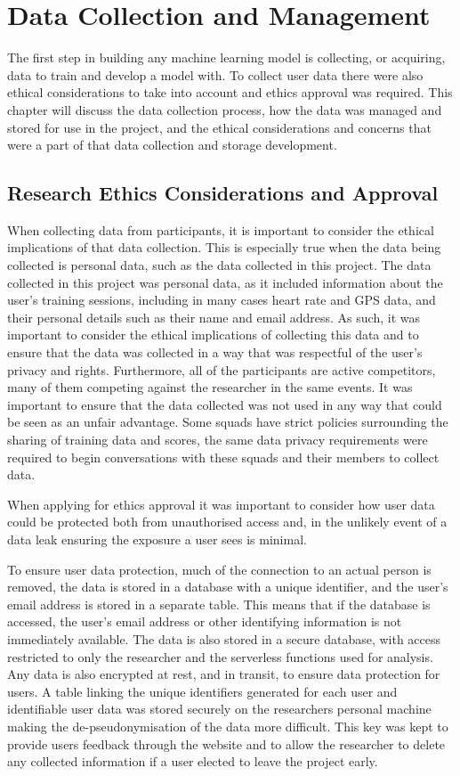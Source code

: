 \chapter{Data Collection and Management}
The first step in building any machine learning model is collecting, or acquiring, data to train and develop a model with. To collect user data there were also ethical considerations to take into account and ethics approval was required. This chapter will discuss the data collection process, how the data was managed and stored for use in the project, and the ethical considerations and concerns that were a part of that data collection and storage development.

\section{Research Ethics Considerations and Approval}
When collecting data from participants, it is important to consider the ethical implications of that data collection. This is especially true when the data being collected is personal data, such as the data collected in this project. The data collected in this project was personal data, as it included information about the user's training sessions, including in many cases heart rate and GPS data, and their personal details such as their name and email address. As such, it was important to consider the ethical implications of collecting this data and to ensure that the data was collected in a way that was respectful of the user's privacy and rights. Furthermore, all of the participants are active competitors, many of them competing against the researcher in the same events. It was important to ensure that the data collected was not used in any way that could be seen as an unfair advantage. Some squads have strict policies surrounding the sharing of training data and scores, the same data privacy requirements were required to begin conversations with these squads and their members to collect data. 

When applying for ethics approval it was important to consider how user data could be protected both from unauthorised access and, in the unlikely event of a data leak ensuring the exposure a user sees is minimal.

To ensure user data protection, much of the connection to an actual person is removed, the data is stored in a database with a unique identifier, and the user's email address is stored in a separate table. This means that if the database is accessed, the user's email address or other identifying information is not immediately available. The data is also stored in a secure database, with access restricted to only the researcher and the serverless functions used for analysis. Any data is also encrypted at rest, and in transit, to ensure data protection for users. A table linking the unique identifiers generated for each user and identifiable user data was stored securely on the researchers personal machine making the de-pseudonymisation of the data more difficult. This key was kept to provide users feedback through the website and to allow the researcher to delete any collected information if a user elected to leave the project early.

